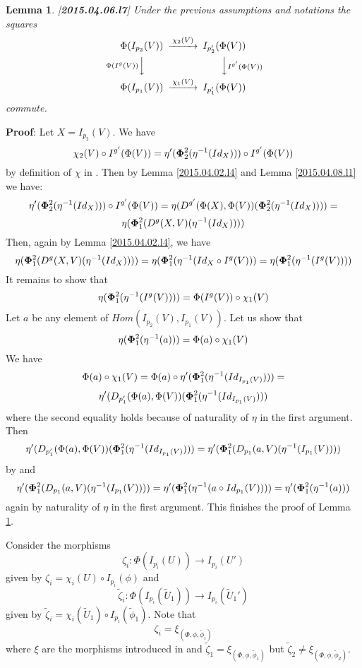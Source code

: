 \documentclass[12pt]{article}
\newenvironment{myproof}{{\bf Proof}:}{\vskip 5mm }
\newtheorem{lemma}[proposition]{Lemma}
\newcommand{\llabel}[1]{\label{#1}[{\bf #1}]}
\newcommand{\sr}{\rightarrow}
\newcommand{\wt}{\widetilde}
\begin{document}
%
\begin{lemma}
\llabel{2015.04.06.l7}
Under the previous assumptions and notations the squares
%
$$
\begin{CD}
\Phi(I_{p_2}(V)) @>\chi_2(V)>> I_{p_2'}(\Phi(V))\\
@V{\Phi(I^g(V))} VV @VV {I^{g'}(\Phi(V))} V\\
\Phi(I_{p_1}(V)) @>\chi_1(V)>> I_{p_1'}(\Phi(V))
\end{CD}
$$
%
commute.
\end{lemma}
%
\begin{myproof}
Let $X=I_{p_2}(V)$. We have
%
$$\chi_2(V)\circ {I^{g'}(\Phi(V))}=\eta'({\bf\Phi}_2^2(\eta^{-1}(Id_{X})))\circ I^{g'}(\Phi(V))$$
%
by definition of $\chi$ in \cite[Construction 5.6]{fromunivwithPi}. Then by Lemma \ref{2015.04.02.l4}  and Lemma \ref{2015.04.08.l1} we have:
%
$$\eta'({\bf\Phi}_2^2(\eta^{-1}(Id_{X})))\circ I^{g'}(\Phi(V))=\eta(D^{g'}(\Phi(X),\Phi(V))({\bf\Phi}_2^2(\eta^{-1}(Id_X))))=$$$$\eta({\bf\Phi}_1^2(D^g(X,V)(\eta^{-1}(Id_X))))$$
%
Then, again by Lemma \ref{2015.04.02.l4},   we have
%
$$\eta({\bf\Phi}_1^2(D^g(X,V)(\eta^{-1}(Id_X))))=\eta({\bf\Phi}_1^2(\eta^{-1}(Id_X\circ I^g(V)))=\eta({\bf\Phi}_1^2(\eta^{-1}(I^g(V))))$$
%
It remains to show that
%
$$\eta({\bf\Phi}_1^2(\eta^{-1}(I^g(V))))=\Phi(I^g(V))\circ \chi_1(V)$$
%
Let $a$ be any element of $Hom(I_{p_2}(V),I_{p_1}(V))$. Let us show that
%
$$\eta({\bf\Phi}_1^2(\eta^{-1}(a)))=\Phi(a)\circ \chi_1(V)$$
%
We have
%
$$\Phi(a)\circ \chi_1(V)=\Phi(a)\circ \eta'({\bf\Phi}^2_1(\eta^{-1}(Id_{I_{p_1}(V)})))=$$$$\eta'(D_{p_1'}(\Phi(a),\Phi(V))({\bf\Phi}^2_1(\eta^{-1}(Id_{I_{p_1}(V)})))$$
%
where the second equality holds because of naturality of $\eta$ in the first argument. Then 
%
$$\eta'(D_{p_1'}(\Phi(a),\Phi(V))({\bf\Phi}^2_1(\eta^{-1}(Id_{I_{p_1}(V)})))=\eta'({\bf\Phi}^2_1(D_{p_1}(a,V)(\eta^{-1}(I_{p_1}(V))))$$
%
by \cite[Lemma 5.4]{fromunivwithPi} and 
%
$$\eta'({\bf\Phi}^2_1(D_{p_1}(a,V)(\eta^{-1}(I_{p_1}(V))))=\eta'({\bf\Phi}^2_1(\eta^{-1}(a\circ Id_{p_1}(V))))=\eta'({\bf\Phi}_1^2(\eta^{-1}(a)))$$
%
again by naturality of $\eta$ in the first argument. This finishes the proof of Lemma \ref{2015.04.06.l7}.
\end{myproof}




Consider the morphisms
%
$$\zeta_i:\Phi(I_{p_i}(U))\sr I_{p_i}(U')$$
%
given by $\zeta_i=\chi_i(U)\circ I_{p_i}(\phi)$ and
%
$$\wt{\zeta}_i:\Phi(I_{p_i}(\wt{U}_1))\sr I_{p_i}(\wt{U}_1')$$
%
given by $\wt{\zeta}_i=\chi_i(\wt{U}_1)\circ I_{p_i}(\wt{\phi}_1)$. Note that 
%
$$\zeta_i=\xi_{(\Phi,\phi,\wt{\phi}_i)}$$
%
where $\xi$ are the morphisms introduced in \cite{fromunivwithPi} and $\wt{\zeta}_1=\xi_{(\Phi,\phi,\wt{\phi}_1)}$ but $\wt{\zeta}_2\ne \xi_{(\Phi,\phi,\wt{\phi}_2)}$.   
\end{document}
